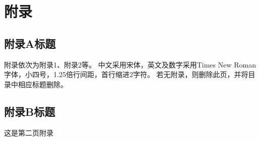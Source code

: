 \appendix

\chapter*{附录}

\pagestyle{plain}

\setcounter{section}{0}
\setcounter{figure}{0}
\setcounter{table}{0}
\setcounter{equation}{0}
\setcounter{algorithm}{0}  %

\renewcommand{\thesection}{\Alph{section}}
\renewcommand{\thefigure}{\Alph{section}-\arabic{figure}}
\renewcommand{\thetable}{\Alph{section}-\arabic{table}}
\renewcommand{\theequation}{\Alph{section}-\arabic{equation}}
\renewcommand{\thealgorithm}{\Alph{section}-\arabic{algorithm}}  %

\section{附录A标题}  %
附录依次为附录1、附录2等。
中文采用宋体，英文及数字采用Times New Roman字体，小四号，1.25倍行间距，首行缩进2字符。
若无附录，则删除此页，并将目录中相应标题删除。

\newpage
\section{附录B标题}
这是第二页附录
